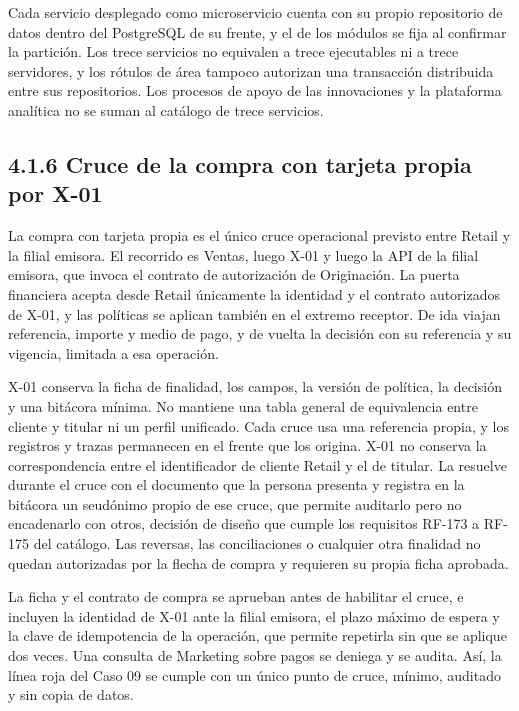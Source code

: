 \documentclass[11pt]{article}
\begin{document}
Cada servicio desplegado como microservicio cuenta con su propio repositorio de datos dentro del PostgreSQL de su frente, y el de los módulos se fija al confirmar la partición. Los trece servicios no equivalen a trece ejecutables ni a trece servidores, y los rótulos de área tampoco autorizan una transacción distribuida entre sus repositorios. Los procesos de apoyo de las innovaciones y la plataforma analítica no se suman al catálogo de trece servicios.

\subsection{4.1.6 Cruce de la compra con tarjeta propia por X-01}

La compra con tarjeta propia es el único cruce operacional previsto entre Retail y la filial emisora. El recorrido es Ventas, luego X-01 y luego la API de la filial emisora, que invoca el contrato de autorización de Originación. La puerta financiera acepta desde Retail únicamente la identidad y el contrato autorizados de X-01, y las políticas se aplican también en el extremo receptor. De ida viajan referencia, importe y medio de pago, y de vuelta la decisión con su referencia y su vigencia, limitada a esa operación.

X-01 conserva la ficha de finalidad, los campos, la versión de política, la decisión y una bitácora mínima. No mantiene una tabla general de equivalencia entre cliente y titular ni un perfil unificado. Cada cruce usa una referencia propia, y los registros y trazas permanecen en el frente que los origina. X-01 no conserva la correspondencia entre el identificador de cliente Retail y el de titular. La resuelve durante el cruce con el documento que la persona presenta y registra en la bitácora un seudónimo propio de ese cruce, que permite auditarlo pero no encadenarlo con otros, decisión de diseño que cumple los requisitos RF-173 a RF-175 del catálogo. Las reversas, las conciliaciones o cualquier otra finalidad no quedan autorizadas por la flecha de compra y requieren su propia ficha aprobada.

La ficha y el contrato de compra se aprueban antes de habilitar el cruce, e incluyen la identidad de X-01 ante la filial emisora, el plazo máximo de espera y la clave de idempotencia de la operación, que permite repetirla sin que se aplique dos veces. Una consulta de Marketing sobre pagos se deniega y se audita. Así, la línea roja del Caso 09 se cumple con un único punto de cruce, mínimo, auditado y sin copia de datos.
\end{document}
